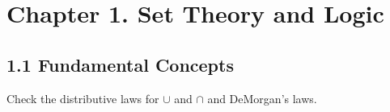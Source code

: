 \documentclass[12pt]{article}
\newenvironment{problem}[2][Exercise]{\begin{trivlist}
\item[\hskip \labelsep {\bfseries #1}\hskip \labelsep {\bfseries #2.}]}{\end{trivlist}}
\begin{document}

\rhead{\today}



\section*{Chapter 1. Set Theory and Logic}

\subsection*{1.1 Fundamental Concepts}


\begin{problem}{1.1.1}
Check the distributive laws for $\cup$ and $\cap$ and DeMorgan's laws.
\end{problem}
\end{document}
